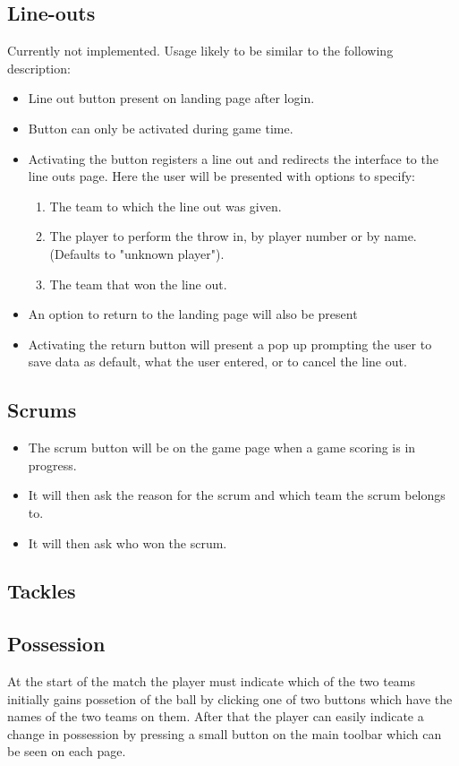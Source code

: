 \documentclass[hidelinks,a4paper,12pt]{article}
\begin{document}
\begin{enumerate}
	\subsection{Line-outs}
	Currently not implemented. Usage likely to be similar to the following description:
	\begin{itemize}
		\item Line out button present on landing page after login.
		\item Button can only be activated during game time.
		\item Activating the button registers a line out and redirects the interface to the line outs page. Here the user will be presented with options to specify:
			\begin{enumerate}
				\item The team to which the line out was given.
				\item The player to perform the throw in, by player number or by name. (Defaults to "unknown player").
				\item The team that won the line out.
			\end{enumerate}
		\item An option to return to the landing page will also be present
		\item Activating the return button will present a pop up prompting the user to save data as default, what the user entered, or to cancel the line out.
	\end{itemize}

	\subsection{Scrums}
		\begin{itemize}
			\item The scrum button will be on the game page when a game scoring is in progress.
			\item It will then ask the reason for the scrum and which team the scrum belongs to.
			\item It will then ask who won the scrum.
		\end{itemize}
		
	\subsection{Tackles}

	\subsection{Possession}
		At the start of the match the player must indicate which of the two teams initially gains possetion of the ball by clicking one of two buttons which have the names of the two teams on them. After that the player can easily indicate a change in possession by pressing a small button on the main toolbar which can be seen on each page.


\end{enumerate}
\end{document}
